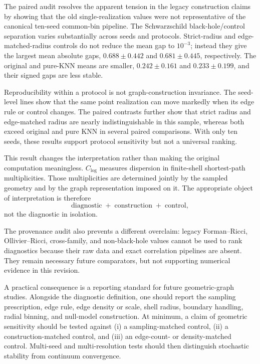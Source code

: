 \documentclass[11pt,a4paper]{article}
\begin{document}
The paired audit resolves the apparent tension in the legacy construction claims by showing that the old single-realization values were not representative of the canonical ten-seed common-bin pipeline. The Schwarzschild black-hole/control separation varies substantially across seeds and protocols. Strict-radius and edge-matched-radius controls do not reduce the mean gap to $10^{-3}$; instead they give the largest mean absolute gaps, $0.688\pm0.442$ and $0.681\pm0.445$, respectively. The original and pure-KNN means are smaller, $0.242\pm0.161$ and $0.233\pm0.199$, and their signed gaps are less stable.

Reproducibility within a protocol is not graph-construction invariance. The seed-level lines show that the same point realization can move markedly when its edge rule or control changes. The paired contrasts further show that strict radius and edge-matched radius are nearly indistinguishable in this sample, whereas both exceed original and pure KNN in several paired comparisons. With only ten seeds, these results support protocol sensitivity but not a universal ranking.

This result changes the interpretation rather than making the original computation meaningless. $C_{\log}$ measures dispersion in finite-shell shortest-path multiplicities. Those multiplicities are determined jointly by the sampled geometry and by the graph representation imposed on it. The appropriate object of interpretation is therefore
\begin{equation}
    \text{diagnostic} \; + \; \text{construction} \; + \; \text{control},
\end{equation}
not the diagnostic in isolation.

The provenance audit also prevents a different overclaim: legacy Forman--Ricci, Ollivier--Ricci, cross-family, and non-black-hole values cannot be used to rank diagnostics because their raw data and exact correlation pipelines are absent. They remain necessary future comparators, but not supporting numerical evidence in this revision.

A practical consequence is a reporting standard for future geometric-graph studies. Alongside the diagnostic definition, one should report the sampling prescription, edge rule, edge density or scale, shell radius, boundary handling, radial binning, and null-model construction. At minimum, a claim of geometric sensitivity should be tested against (i) a sampling-matched control, (ii) a construction-matched control, and (iii) an edge-count- or density-matched control. Multi-seed and multi-resolution tests should then distinguish stochastic stability from continuum convergence.
\end{document}
